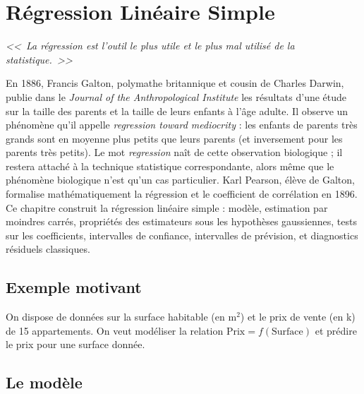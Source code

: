 \chapter{R\'egression Lin\'eaire Simple}
\label{ch:regression-simple}

\begin{center}
\textit{<<~La r\'egression est l'outil le plus utile et le plus mal utilis\'e de la statistique.~>>}
\end{center}

En 1886, Francis Galton, polymathe britannique et cousin de Charles Darwin, publie dans le \emph{Journal of the Anthropological Institute} les résultats d'une étude sur la taille des parents et la taille de leurs enfants à l'âge adulte. Il observe un phénomène qu'il appelle \emph{regression toward mediocrity} : les enfants de parents très grands sont en moyenne plus petits que leurs parents (et inversement pour les parents très petits). Le mot \emph{regression} naît de cette observation biologique ; il restera attaché à la technique statistique correspondante, alors même que le phénomène biologique n'est qu'un cas particulier. Karl Pearson, élève de Galton, formalise mathématiquement la régression et le coefficient de corrélation en 1896. Ce chapitre construit la régression linéaire simple : modèle, estimation par moindres carrés, propriétés des estimateurs sous les hypothèses gaussiennes, tests sur les coefficients, intervalles de confiance, intervalles de prévision, et diagnostics résiduels classiques.

\section{Exemple motivant}

On dispose de donn\'ees sur la surface habitable (en m$^2$) et le prix de vente (en k\texteuro) de 15 appartements. On veut mod\'eliser la relation $\text{Prix}=f(\text{Surface})$ et pr\'edire le prix pour une surface donn\'ee.

\section{Le mod\`ele}

